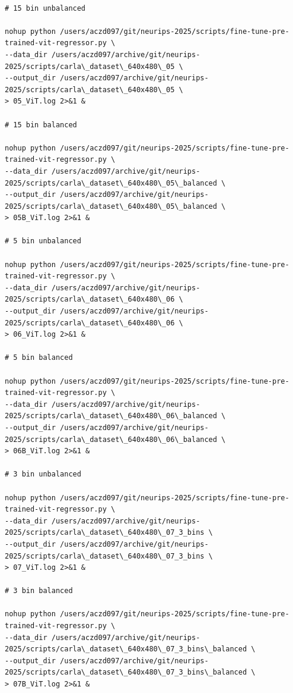 \begin{verbatim}

# 15 bin unbalanced

nohup python /users/aczd097/git/neurips-2025/scripts/fine-tune-pre-trained-vit-regressor.py \
--data_dir /users/aczd097/archive/git/neurips-2025/scripts/carla\_dataset\_640x480\_05 \
--output_dir /users/aczd097/archive/git/neurips-2025/scripts/carla\_dataset\_640x480\_05 \
> 05_ViT.log 2>&1 &

# 15 bin balanced

nohup python /users/aczd097/git/neurips-2025/scripts/fine-tune-pre-trained-vit-regressor.py \
--data_dir /users/aczd097/archive/git/neurips-2025/scripts/carla\_dataset\_640x480\_05\_balanced \
--output_dir /users/aczd097/archive/git/neurips-2025/scripts/carla\_dataset\_640x480\_05\_balanced \
> 05B_ViT.log 2>&1 &

# 5 bin unbalanced

nohup python /users/aczd097/git/neurips-2025/scripts/fine-tune-pre-trained-vit-regressor.py \
--data_dir /users/aczd097/archive/git/neurips-2025/scripts/carla\_dataset\_640x480\_06 \
--output_dir /users/aczd097/archive/git/neurips-2025/scripts/carla\_dataset\_640x480\_06 \
> 06_ViT.log 2>&1 &

# 5 bin balanced

nohup python /users/aczd097/git/neurips-2025/scripts/fine-tune-pre-trained-vit-regressor.py \
--data_dir /users/aczd097/archive/git/neurips-2025/scripts/carla\_dataset\_640x480\_06\_balanced \
--output_dir /users/aczd097/archive/git/neurips-2025/scripts/carla\_dataset\_640x480\_06\_balanced \
> 06B_ViT.log 2>&1 &

# 3 bin unbalanced

nohup python /users/aczd097/git/neurips-2025/scripts/fine-tune-pre-trained-vit-regressor.py \
--data_dir /users/aczd097/archive/git/neurips-2025/scripts/carla\_dataset\_640x480\_07_3_bins \
--output_dir /users/aczd097/archive/git/neurips-2025/scripts/carla\_dataset\_640x480\_07_3_bins \
> 07_ViT.log 2>&1 &

# 3 bin balanced

nohup python /users/aczd097/git/neurips-2025/scripts/fine-tune-pre-trained-vit-regressor.py \
--data_dir /users/aczd097/archive/git/neurips-2025/scripts/carla\_dataset\_640x480\_07_3_bins\_balanced \
--output_dir /users/aczd097/archive/git/neurips-2025/scripts/carla\_dataset\_640x480\_07_3_bins\_balanced \
> 07B_ViT.log 2>&1 &

\end{verbatim}

